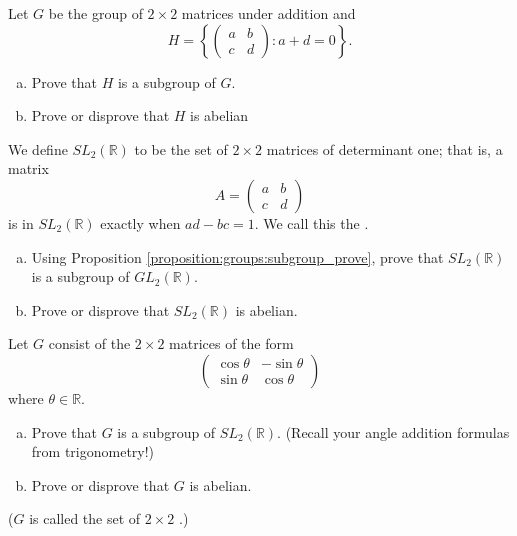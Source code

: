 \begin{exercise}{}
Let $G$ be the group of $2 \times 2$ matrices under addition and
\[
H
=
\left\{
\begin{pmatrix}
a & b \\
c & d
\end{pmatrix}
:
a + d = 0
\right\}.
\]
\begin{enumerate}[(a)]
\item
Prove that $H$ is a subgroup of $G$.
\item
Prove or disprove that $H$ is abelian
\end{enumerate}
\end{exercise}


\begin{exercise}{70}
We define $SL_2( {\mathbb R})$\label{speciallinear} to be the set of $2 \times 2$ matrices of determinant one; that is, a matrix
\[
A =
\begin{pmatrix}
a & b \\
c & d
\end{pmatrix}
\]
is in $SL_2( {\mathbb R})$ exactly when $ad - bc = 1$.  We call this the  \label{speciallinear}.

\begin{enumerate}[(a)]
\item
Using Proposition \ref{proposition:groups:subgroup_prove}, prove that $SL_2( {\mathbb R})$ is a subgroup of $GL_2( {\mathbb R})$.
\item
Prove or disprove that $SL_2( {\mathbb R})$ is abelian.
\end{enumerate}
\end{exercise}

\begin{exercise}{}
Let $G$ consist of the $2 \times 2$ matrices of the form
\[
\begin{pmatrix}
\cos \theta & -\sin \theta \\
\sin \theta & \cos \theta
\end{pmatrix}
\]
where $\theta \in {\mathbb R}$. 
\begin{enumerate}[(a)]
\item
Prove that $G$ is a subgroup of $SL_2(
{\mathbb R})$.  (Recall your angle addition formulas from trigonometry!)

\item
Prove or disprove that $G$ is abelian.  
\end{enumerate} 
($G$ is called the set of $2 \times 2$ .)
\end{exercise} 
 

